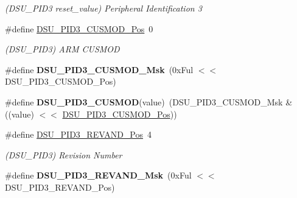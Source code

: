 \begin{DoxyCompactItemize}
\begin{DoxyCompactList}\small\item\em (D\+S\+U\+\_\+\+P\+I\+D3 reset\+\_\+value) Peripheral Identification 3 \end{DoxyCompactList}\item 
\hypertarget{group___s_a_m_l21___d_s_u_gab4e2a84699bcb677236554a721bbe8f4}{}\#define \hyperlink{group___s_a_m_l21___d_s_u_gab4e2a84699bcb677236554a721bbe8f4}{D\+S\+U\+\_\+\+P\+I\+D3\+\_\+\+C\+U\+S\+M\+O\+D\+\_\+\+Pos}~0\label{group___s_a_m_l21___d_s_u_gab4e2a84699bcb677236554a721bbe8f4}

\begin{DoxyCompactList}\small\item\em (D\+S\+U\+\_\+\+P\+I\+D3) A\+R\+M C\+U\+S\+M\+O\+D \end{DoxyCompactList}\item 
\hypertarget{group___s_a_m_l21___d_s_u_ga42edeb1d05942c2e02601a8e1abebdaa}{}\#define {\bfseries D\+S\+U\+\_\+\+P\+I\+D3\+\_\+\+C\+U\+S\+M\+O\+D\+\_\+\+Msk}~(0x\+Ful $<$$<$ D\+S\+U\+\_\+\+P\+I\+D3\+\_\+\+C\+U\+S\+M\+O\+D\+\_\+\+Pos)\label{group___s_a_m_l21___d_s_u_ga42edeb1d05942c2e02601a8e1abebdaa}

\item 
\hypertarget{group___s_a_m_l21___d_s_u_gaffea388f2f5da700b0e9143232f45d37}{}\#define {\bfseries D\+S\+U\+\_\+\+P\+I\+D3\+\_\+\+C\+U\+S\+M\+O\+D}(value)~(D\+S\+U\+\_\+\+P\+I\+D3\+\_\+\+C\+U\+S\+M\+O\+D\+\_\+\+Msk \& ((value) $<$$<$ \hyperlink{group___s_a_m_l21___d_s_u_gab4e2a84699bcb677236554a721bbe8f4}{D\+S\+U\+\_\+\+P\+I\+D3\+\_\+\+C\+U\+S\+M\+O\+D\+\_\+\+Pos}))\label{group___s_a_m_l21___d_s_u_gaffea388f2f5da700b0e9143232f45d37}

\item 
\hypertarget{group___s_a_m_l21___d_s_u_ga10e1892be1ad4ad3d2eb63267999efb9}{}\#define \hyperlink{group___s_a_m_l21___d_s_u_ga10e1892be1ad4ad3d2eb63267999efb9}{D\+S\+U\+\_\+\+P\+I\+D3\+\_\+\+R\+E\+V\+A\+N\+D\+\_\+\+Pos}~4\label{group___s_a_m_l21___d_s_u_ga10e1892be1ad4ad3d2eb63267999efb9}

\begin{DoxyCompactList}\small\item\em (D\+S\+U\+\_\+\+P\+I\+D3) Revision Number \end{DoxyCompactList}\item 
\hypertarget{group___s_a_m_l21___d_s_u_ga8aa490a6598622e9f161af9ec209d893}{}\#define {\bfseries D\+S\+U\+\_\+\+P\+I\+D3\+\_\+\+R\+E\+V\+A\+N\+D\+\_\+\+Msk}~(0x\+Ful $<$$<$ D\+S\+U\+\_\+\+P\+I\+D3\+\_\+\+R\+E\+V\+A\+N\+D\+\_\+\+Pos)\label{group___s_a_m_l21___d_s_u_ga8aa490a6598622e9f161af9ec209d893}


\end{DoxyCompactItemize}
